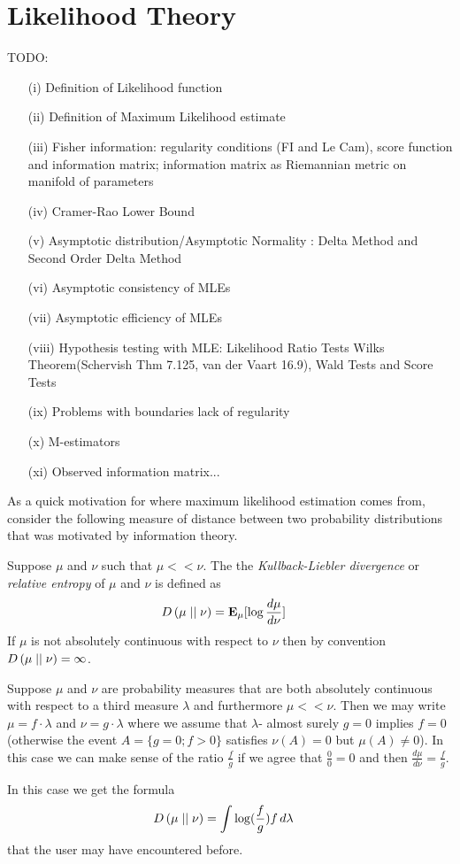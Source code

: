 \chapter{Likelihood Theory}
TODO:
\begin{itemize}
\item[(i)] Definition of Likelihood function
\item[(ii)] Definition of Maximum Likelihood estimate
\item[(iii)] Fisher information: regularity conditions (FI and Le Cam), score function
  and information matrix; information matrix as Riemannian metric on
  manifold of parameters
\item[(iv)] Cramer-Rao Lower Bound
\item[(v)] Asymptotic distribution/Asymptotic Normality : Delta Method and Second Order Delta Method
\item[(vi)] Asymptotic consistency of MLEs 
\item[(vii)] Asymptotic efficiency of MLEs
\item[(viii)] Hypothesis testing with MLE: Likelihood Ratio Tests 
  Wilks Theorem(Schervish Thm 7.125, van der Vaart 16.9), Wald Tests and Score Tests
\item[(ix)] Problems with boundaries lack of regularity
\item[(x)] M-estimators
\item[(xi)]Observed information matrix...
\end{itemize}

As a quick motivation for where maximum likelihood estimation comes
from, consider the following measure of distance between two
probability distributions that was motivated by information theory.
\begin{defn}Suppose $\mu$ and $\nu$ such that $\mu << \nu$.  The the \emph{Kullback-Liebler divergence} or \emph{relative
    entropy} of $\mu$ and $\nu$ is defined as
\begin{align*}
D\left( \mu \mid\mid \nu \right) &= \textbf{E}_{\mu}[\log \frac{d\mu}{d\nu}]
\end{align*}
If $\mu$ is not absolutely continuous with respect to $\nu$ then by
convention $D\left( \mu \mid\mid \nu \right) = \infty$.
\end{defn}

\begin{examp}
Suppose $\mu$ and $\nu$ are probability measures that are both
absolutely continuous with respect to a third measure $\lambda$ and
furthermore $\mu << \nu$.  Then we may write $\mu = f \cdot \lambda$
and $\nu = g \cdot \lambda$ where we assume that $\lambda$- almost
surely $g=0$ implies $f=0$ (otherwise the event $A=\lbrace g=0; f>0 \rbrace$
satisfies $\nu(A)=0$ but $\mu(A)\neq 0$).  In this case we can make sense of the
ratio $\frac{f}{g}$ if we agree that $\frac{0}{0} = 0$ and then $\frac{d\mu}{d\nu} = \frac{f}{g}$.

In this case we get the formula 
\begin{align*}
D\left( \mu \mid\mid \nu \right) &= \int \log(\frac{f}{g}) f \, d\lambda
\end{align*}
that the user may have encountered before.
\end{examp}

